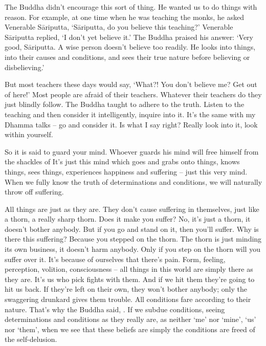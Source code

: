 The Buddha didn't encourage this sort of thing. He wanted us to do things with reason. For example, at one time when he was teaching the monks, he asked Venerable S\=ariputta, `S\=ariputta, do you believe this teaching?' Venerable S\=ariputta replied, `I don't yet believe it.' The Buddha praised his answer: `Very good, S\=ariputta. A wise person doesn't believe too readily. He looks into things, into their causes and conditions, and sees their true nature before believing or disbelieving.' 

But most teachers these days would say, `What?! You don't believe me? Get out of here!' Most people are afraid of their teachers. Whatever their teachers do they just blindly follow. The Buddha taught to adhere to the truth. Listen to the teaching and then consider it intelligently, inquire into it. It's the same with my Dhamma talks -- go and consider it. Is what I say right? Really look into it, look within yourself. 

So it is said to guard your mind. Whoever guards his mind will free himself from the shackles of  It's just this mind which goes and grabs onto things, knows things, sees things, experiences happiness and suffering -- just this very mind. When we fully know the truth of determinations and conditions, we will naturally throw off suffering. 

All things are just as they are. They don't cause suffering in themselves, just like a thorn, a really sharp thorn. Does it make you suffer? No, it's just a thorn, it doesn't bother anybody. But if you go and stand on it, then you'll suffer. Why is there this suffering? Because you stepped on the thorn. The thorn is just minding its own business, it doesn't harm anybody. Only if you step on the thorn will you suffer over it. It's because of ourselves that there's pain. Form, feeling, perception, volition, consciousness -- all things in this world are simply there as they are. It's us who pick fights with them. And if we hit them they're going to hit us back. If they're left on their own, they won't bother anybody; only the swaggering drunkard gives them trouble. All conditions fare according to their nature. That's why the Buddha said, . If we subdue conditions, seeing determinations and conditions as they really are, as neither `me' nor `mine', `us' nor `them', when we see that these beliefs are simply  the conditions are freed of the self-delusion. 


